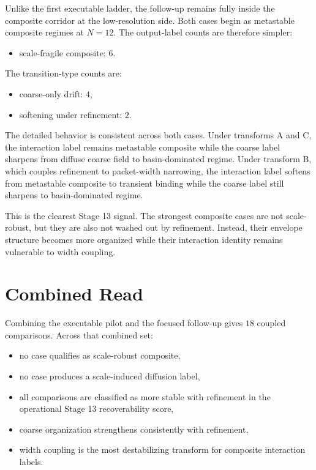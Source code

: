\documentclass[11pt]{article}
\begin{document}
Unlike the first executable ladder, the follow-up remains fully inside the composite corridor at the low-resolution side. Both cases begin as metastable composite regimes at $N=12$. The output-label counts are therefore simpler:
\begin{itemize}
\item scale-fragile composite: $6$.
\end{itemize}

The transition-type counts are:
\begin{itemize}
\item coarse-only drift: $4$,
\item softening under refinement: $2$.
\end{itemize}

The detailed behavior is consistent across both cases. Under transforms A and C, the interaction label remains metastable composite while the coarse label sharpens from diffuse coarse field to basin-dominated regime. Under transform B, which couples refinement to packet-width narrowing, the interaction label softens from metastable composite to transient binding while the coarse label still sharpens to basin-dominated regime.

This is the clearest Stage 13 signal. The strongest composite cases are not scale-robust, but they are also not washed out by refinement. Instead, their envelope structure becomes more organized while their interaction identity remains vulnerable to width coupling.

\section{Combined Read}

Combining the executable pilot and the focused follow-up gives $18$ coupled comparisons. Across that combined set:
\begin{itemize}
\item no case qualifies as scale-robust composite,
\item no case produces a scale-induced diffusion label,
\item all comparisons are classified as more stable with refinement in the operational Stage 13 recoverability score,
\item coarse organization strengthens consistently with refinement,
\item width coupling is the most destabilizing transform for composite interaction labels.
\end{itemize}
\end{document}
